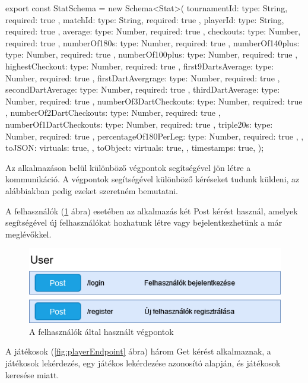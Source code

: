 \begin{cpp}
export const StatSchema = new Schema<Stat>(
  {
    tournamentId: { type: String, required: true },
    matchId: { type: String, required: true },
    playerId: { type: String, required: true },
    average: { type: Number, required: true },
    checkouts: { type: Number, required: true },
    numberOf180s: { type: Number, required: true },
    numberOf140plus: { type: Number, required: true },
    numberOf100plus: { type: Number, required: true },
    highestCheckout: { type: Number, required: true },
    first9DartsAverage: { type: Number, required: true },
    firstDartAvergrage: { type: Number, required: true },
    secondDartAverage: { type: Number, required: true },
    thirdDartAverage: { type: Number, required: true },
    numberOf3DartCheckouts: { type: Number, required: true },
    numberOf2DartCheckouts: { type: Number, required: true },
    numberOf1DartCheckouts: { type: Number, required: true },
    triple20s: { type: Number, required: true },
    percentageOf180PerLeg: { type: Number, required: true },
  },
  {
    toJSON: {
      virtuals: true,
    },
    toObject: {
      virtuals: true,
    },
    timestamps: true,
  }
);
\end{cpp}

Az alkalmazáson belül különböző végpontok segítségével jön létre a kommunikáció. A végpontok segítségével különböző kéréseket tudunk küldeni, az alábbiakban pedig ezeket szeretném bemutatni.\newline

A felhasználók (\ref{fig:userEndpoint} ábra) esetében az alkalmazás két Post kérést használ, amelyek segítségével új felhasználókat hozhatunk létre vagy bejelentkezhetünk a már meglévőkkel.\newline

\begin{figure}[h]
\centering
\includegraphics[scale=0.6]{images/User_Vegpontok.drawio.png}
\caption{A felhasználók által használt végpontok}
\label{fig:userEndpoint}
\end{figure}

A játékosok (\ref{fig:playerEndpoint} ábra) három Get kérést alkalmaznak, a játékosok lekérdezés, egy játékos lekérdezése azonosító alapján, és játékosok keresése miatt.

